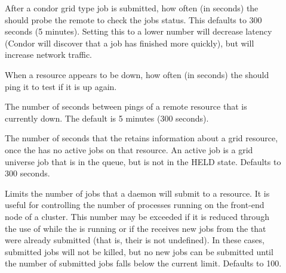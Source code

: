 \begin{description}
\item[]
\label{param:CondorJobPollInterval}
After a condor grid type job is submitted, how often (in seconds) the 
should probe the remote  to check the jobs status.  
This defaults to 300 seconds (5 minutes).
Setting this to a lower number will decrease latency (Condor will discover
that a job has finished more quickly), but will increase network traffic.


\item[]
\label{param:GridmanagerResourceProbeInterval}
When a resource appears to be down, how often (in seconds) the
should ping it to test if it is up again.

\item[]
\label{param:GridmanagerResourceProbeDelay} The number of seconds
between pings of a remote resource that is currently down. The default
is 5 minutes (300 seconds).

\item[]
  \label{param:GridmanagerEmptyResourceDelay} The number of seconds
  that the  retains information about a grid
  resource, once the  has no active jobs
  on that resource.
  An active job is a grid universe job that is in the queue,
  but is not in the HELD state.
  Defaults to 300 seconds.

\item[]
\label{param:GridmanagerMaxSubmittedJobsPerResource}
Limits the number of jobs
that a  daemon will submit to a resource.
It is useful for controlling the number of 
processes running on the front-end node of a cluster.
This number may be exceeded if it is reduced through the use
of  while the  is running
or if the  receives new
jobs from the  that were already submitted
(that is, their  is not undefined).
In these cases, submitted jobs will not be killed,
but no new jobs can be submitted until the number of submitted
jobs falls below the current limit.
Defaults to 100.


\end{description}
